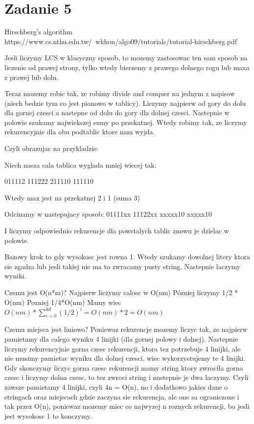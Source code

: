 \documentclass[12pt]{article}
\begin{document}
\section{Zadanie 5}
Hirschberg's algorithm
https://www.cs.nthu.edu.tw/~wkhon/algo09/tutorials/tutorial-hirschberg.pdf

Jesli liczymy LCS w klasyczny sposob, to mozemy zastosowac ten sam sposob na liczenie od prawej strony, tylko wtedy bierzemy z prawego dolnego rogu lub maxa z prawej lub dolu. 

Teraz mozemy robic tak, ze robimy divide and conquer na jednym z napisow (niech bedzie tym co jest pionowo w tablicy). Liczymy najpierw od gory do dolu dla gornej czesci a nastepne od dolu do gory dla dolnej czesci. Nastepnie w polowie szukamy najwiekszej sumy po przekatnej. Wtedy robimy tak, ze liczymy rekurencyjnie dla obu podtablic ktore nam wyjda. 

Czyli obrazujac na przykladzie:

Niech nasza cala tablica wyglada mniej wiecej tak:

011112
111222
211110
111110

Wtedy max jest na przekatnej 2 i 1 (suma 3)

Odcinamy w nastepujacy sposob:
01111xx
11122xx
xxxxx10
xxxxx10

I liczymy odpowiednio rekurencje dla powstalych tablic znowu je dzielac w polowie.

Bazowy krok to gdy wysokosc jest rowna 1. Wtedy szukamy dowolnej litery ktora sie zgadza lub jesli takiej nie ma to zwracamy pusty string. Nastepnie laczymy wyniki.

Czemu jest O(n*m)?
Najpierw liczymy calosc w O(nm)
Pózniej liczymy 1/2 * O(nm)
Pozniej 1/4*O(nm)
Mamy wiec $O(nm) * \sum_{i=0}^{\inf} (1/2)^i = O(nm) * 2 = O(nm)$

Czemu miejsca jest liniowo?
Poniewaz rekurencje mozemy liczyc tak, ze najpierw pamietamy dla calego wyniku 4 linijki (dla gornej polowy i dolnej). Nastepnie liczymy rekurencyjnie gorna czesc rekurencji, ktora tez potrzebuje 4 linijki, ale nie musimy pamietac wyniku dla dolnej czesci, wiec wykorzystujemy te 4 linijki. Gdy skonczymy liczyc gorna czesc rekurencji mamy string ktory zwrocila gorna czesc i liczymy dolna czesc, to tez zwroci string i nastepnie je dwa laczymy. Czyli zawsze pamietamy 4 linijki, czyli 4n = O(n), no i dodatkowo jakies dane o stringach oraz miejscach gdzie zaczyna sie rekurencja, ale one sa ograniczone i tak przez O(n), poniewaz mozemy miec co najwyzej n roznych rekurencji, bo jesli jest wysokosc 1 to konczymy.
\end{document}

